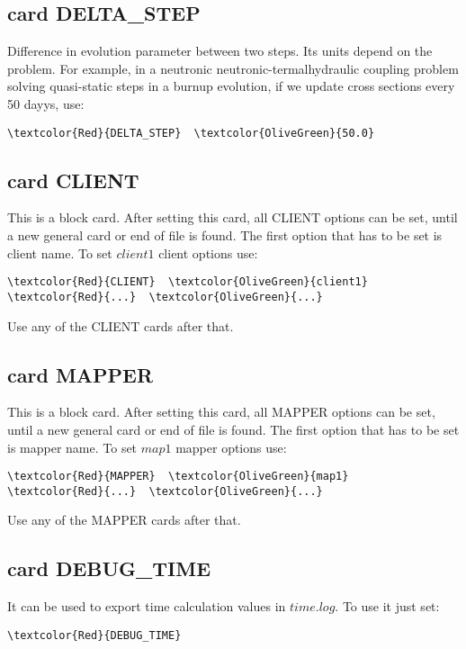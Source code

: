 \subsection{card DELTA_STEP}
Difference in evolution parameter between two steps. Its units depend on the problem. For example, in a neutronic neutronic-termalhydraulic coupling problem solving quasi-static steps in a burnup evolution, if we update cross sections every 50 dayys, use:
\begin{Verbatim}[frame=single,commandchars=\\\{\}]
\textcolor{Red}{DELTA_STEP}  \textcolor{OliveGreen}{50.0}
\end{Verbatim}

\subsection{card CLIENT}
This is a block card. After setting this card, all CLIENT options can be set, until a new general card or end of file is found. The first option that has to be set is client name. To set $client1$ client options use:
\begin{Verbatim}[frame=single,commandchars=\\\{\}]
\textcolor{Red}{CLIENT}  \textcolor{OliveGreen}{client1}
\textcolor{Red}{...}  \textcolor{OliveGreen}{...}
\end{Verbatim}
Use any of the CLIENT cards after that.

\subsection{card MAPPER}
This is a block card. After setting this card, all MAPPER options can be set, until a new general card or end of file is found. The first option that has to be set is mapper name. To set $map1$ mapper options use:
\begin{Verbatim}[frame=single,commandchars=\\\{\}]
\textcolor{Red}{MAPPER}  \textcolor{OliveGreen}{map1}
\textcolor{Red}{...}  \textcolor{OliveGreen}{...}
\end{Verbatim}
Use any of the MAPPER cards after that.

\subsection{card DEBUG_TIME}
It can be used to export time calculation values in $time.log$. To use it just set:
\begin{Verbatim}[frame=single,commandchars=\\\{\}]
\textcolor{Red}{DEBUG_TIME}
\end{Verbatim}


